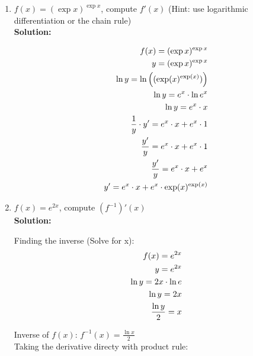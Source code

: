 \documentclass[a4paper]{article}
\begin{document}
\begin{enumerate}
\begin{enumerate}
	
	
	\item $f(x) = (\exp x)^{\exp x}$, compute $f'(x)$ (Hint: use logarithmic differentiation or the chain rule)\\
	\textbf{Solution:}\\
	
	
\begin{align*}
	f(x) = (\exp x)^{\exp x}\notag\\
	y = (\exp x)^{\exp x}\notag\\
	\ln y = \ln \left( (\exp(x)^{\exp(x)})  \right)\notag\\
	\ln y = e^x \cdot \ln e^x\notag\\
	\ln y = e^x \cdot x\notag\\
	\frac{1}{y} \cdot y' = e^x \cdot x + e^x \cdot 1\notag\\
	\frac{y'}{y} = e^x \cdot x + e^x \cdot 1\notag\\
	\frac{y'}{y} = e^x \cdot x + e^x\notag\\
	y' = e^x \cdot x + e^x \cdot \exp(x)^{\exp(x)}\notag
\end{align*}	
	
	\item $f(x) = e^{2x}$, compute $(f^{-1})'(x)$\\
	\textbf{Solution:}\\
	
	
	
	
Finding the inverse (Solve for x):\\

\begin{align*}
	f(x) = e^{2x}\notag\\
	y = e^{2x}\notag\\
	\ln y = 2x \cdot \ln e\notag\\
	\ln y = 2x\notag\\
	\frac{\ln y}{2} = x\notag
\end{align*}	

Inverse of $f(x)$: $f^{-1}(x) = \frac{\ln x}{2}$\\
Taking the derivative directy with product rule:\\


\end{enumerate}
\end{enumerate}
\end{document}

